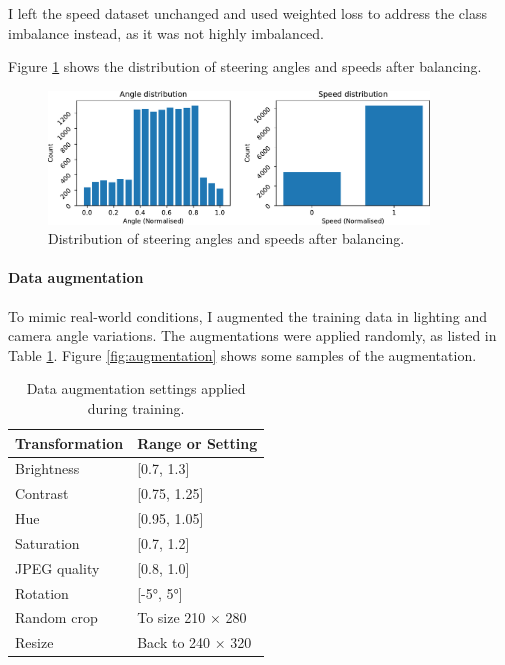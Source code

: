 \documentclass{article}
\begin{document}
I left the speed dataset unchanged and used weighted loss to address the class imbalance instead, as it was not highly imbalanced.

Figure \ref{fig:angle_speed_distribution_balanced} shows the distribution of steering angles and speeds after balancing.

\begin{figure}[h]
  \centering
  \includegraphics[width=0.9\textwidth]{figures/angle_speed_distribution_balanced.pdf}
  \caption{Distribution of steering angles and speeds after balancing.}
  \label{fig:angle_speed_distribution_balanced}
\end{figure}

\paragraph{Data augmentation}
\label{sec:data_augmentation}
To mimic real-world conditions, I augmented the training data in lighting and camera angle variations. The augmentations were applied randomly, as listed in Table \ref{tab:data_augmentation}. Figure \ref{fig:augmentation} shows some samples of the augmentation.

\begin{table}[H]
  \centering
  \renewcommand{\arraystretch}{1.2}
  \begin{tabular}{|l|l|}
    \hline
    \textbf{Transformation} & \textbf{Range or Setting} \\
    \hline
    Brightness              & [0.7, 1.3]                \\
    Contrast                & [0.75, 1.25]              \\
    Hue                     & [0.95, 1.05]              \\
    Saturation              & [0.7, 1.2]                \\
    JPEG quality            & [0.8, 1.0]                \\
    Rotation                & [-5°, 5°]                 \\
    Random crop             & To size 210 × 280         \\
    Resize                  & Back to 240 × 320         \\
    \hline
  \end{tabular}
  \vspace{0.5em}
  \caption{Data augmentation settings applied during training.}
  \label{tab:data_augmentation}
\end{table}
\end{document}
